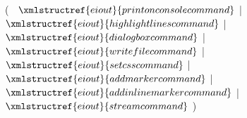 ( 
$~$ $\xmlstructref{eiout}{printonconsolecommand}$ 
| $\xmlstructref{eiout}{highlightlinescommand}$ 
| $\xmlstructref{eiout}{dialogboxcommand}$ 
| $\xmlstructref{eiout}{writefilecommand}$ 
| $\xmlstructref{eiout}{setcsscommand}$
| $\xmlstructref{eiout}{addmarkercommand}$
| $\xmlstructref{eiout}{addinlinemarkercommand}$
| $\xmlstructref{eiout}{streamcommand}$
)
